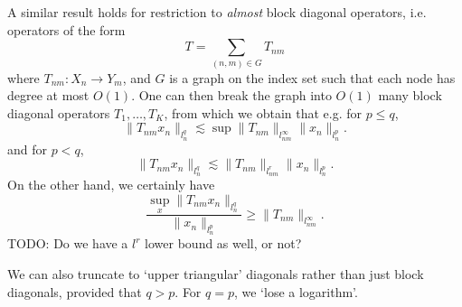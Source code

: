 A similar result holds for restriction to \emph{almost} block diagonal operators, i.e. operators of the form
%
\[ T = \sum_{(n,m) \in G} T_{nm} \]
%
where $T_{nm}: X_n \to Y_m$, and $G$ is a graph on the index set such that each node has degree at most $O(1)$. One can then break the graph into $O(1)$ many block diagonal operators $T_1, \dots, T_K$, from which we obtain that e.g. for $p \leq q$,
%
\[ \| T_{nm} x_n \|_{l^q_n} \lesssim \sup \| T_{nm} \|_{l^\infty_{nm}} \| x_n \|_{l^p_n}. \]
%
and for $p < q$,
%
\[ \| T_{nm} x_n \|_{l^q_n} \lesssim \| T_{nm} \|_{l^r_{nm}} \| x_n \|_{l^p_n}. \]
%
On the other hand, we certainly have 
%
\[ \frac{\sup_x \| T_{nm} x_n \|_{l^q_n}}{\| x_n \|_{l^p_n}} \geq \| T_{nm} \|_{l^\infty_{nm}}. \]
%
TODO: Do we have a $l^r$ lower bound as well, or not?

We can also truncate to `upper triangular' diagonals rather than just block diagonals, provided that $q > p$. For $q = p$, we `lose a logarithm'.

